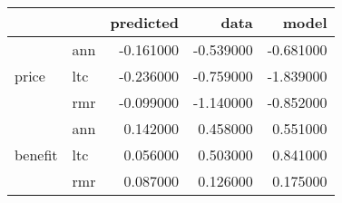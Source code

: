 \begin{tabular}{llrrr}
\toprule
 &  & predicted & data & model \\
\midrule
\multirow[t]{3}{*}{price} & ann & -0.161000 & -0.539000 & -0.681000 \\
 & ltc & -0.236000 & -0.759000 & -1.839000 \\
 & rmr & -0.099000 & -1.140000 & -0.852000 \\
\cline{1-5}
\multirow[t]{3}{*}{benefit} & ann & 0.142000 & 0.458000 & 0.551000 \\
 & ltc & 0.056000 & 0.503000 & 0.841000 \\
 & rmr & 0.087000 & 0.126000 & 0.175000 \\
\cline{1-5}
\bottomrule
\end{tabular}
